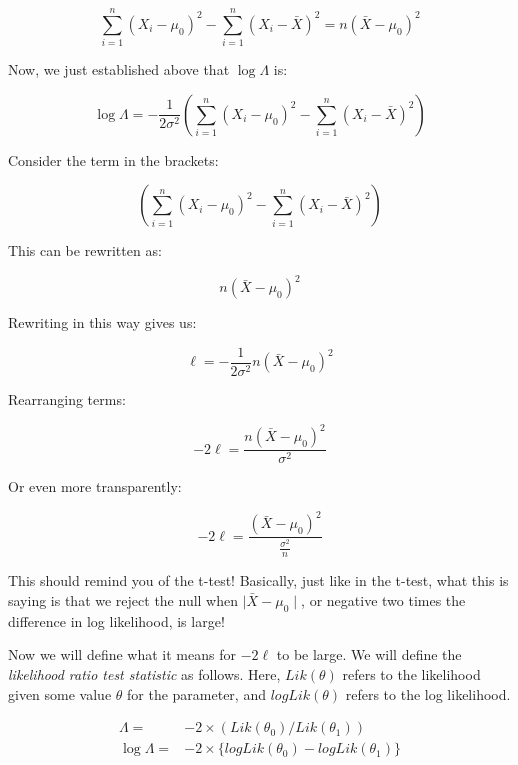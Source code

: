 \documentclass[12pt,]{krantz}
\begin{document}
\begin{equation}
\sum_{i=1}^n (X_i -\mu_0)^2 - \sum_{i=1}^n (X_i - \bar{X})^2 = n(\bar{X} - \mu_0)^2 
\end{equation}

Now, we just established above that \(\log \Lambda\) is:

\begin{equation}
\log \Lambda= -\frac{1}{2\sigma^2} \left( \sum_{i=1}^n (X_i - \mu_0)^2  -  \sum_{i=1}^n (X_i - \bar{X})^2 \right)
\end{equation}

Consider the term in the brackets:

\begin{equation}
(\sum_{i=1}^n (X_i - \mu_0)^2  -  \sum_{i=1}^n (X_i - \bar{X})^2)
\end{equation}

This can be rewritten as:

\begin{equation}
n(\bar{X} - \mu_0)^2
\end{equation}

Rewriting in this way gives us:

\begin{equation}
\ell = -\frac{1}{2\sigma^2}   n(\bar{X} - \mu_0)^2 
\end{equation}

Rearranging terms:

\begin{equation}
-2 \ell =    \frac{n(\bar{X} - \mu_0)^2 }{\sigma^2}
\end{equation}

Or even more transparently:

\begin{equation}
-2 \ell =    \frac{(\bar{X} - \mu_0)^2 }{\frac{\sigma^2}{n}}
\end{equation}

This should remind you of the t-test! Basically, just like in the t-test, what this is saying is that we reject the null when \(\mid \bar{X} - \mu_0\mid\), or negative two times the difference in log likelihood, is large!

Now we will define what it means for \(-2\ell\) to be large. We will define the \emph{likelihood ratio test statistic} as follows. Here, \(Lik(\theta)\) refers to the likelihood given some value \(\theta\) for the parameter, and
\(logLik(\theta)\) refers to the log likelihood.

\begin{equation}
\begin{split}
\Lambda =& -2\times (Lik(\theta_0)/Lik(\theta_1)) \\
\log \Lambda=& -2\times \{logLik(\theta_0)-logLik(\theta_1)\}\\
\end{split}
\end{equation}
\end{document}

